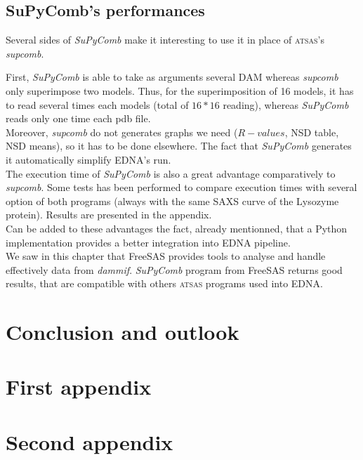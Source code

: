\documentclass[a4paper, 11pt]{report}
\begin{document}
\section{SuPyComb's performances}%

Several sides of \textit{SuPyComb} make it interesting to use it in 
place of \textsc{atsas}'s \textit{supcomb}.

First, \textit{SuPyComb} is able to take as arguments several DAM 
whereas \textit{supcomb} only superimpose two models. 
Thus, for the superimposition of 16 models, it has to read several 
times each models (total of $16*16$ reading), whereas 
\textit{SuPyComb} reads only one time each pdb file.\\
Moreover, \textit{supcomb} do not generates graphs we need 
($R-values$, NSD table, NSD means), so it has to be done elsewhere. 
The fact that \textit{SuPyComb} generates it automatically simplify 
EDNA's run.\\
The execution time of \textit{SuPyComb} is also a great advantage 
comparatively to \textit{supcomb}. 
Some tests has been performed to compare execution times with several 
option of both programs (always with the same SAXS curve of the 
Lysozyme protein). 
Results are presented in the appendix.\\%
Can be added to these advantages the fact, already mentionned, that a 
Python implementation provides a better integration into EDNA 
pipeline.\\

We saw in this chapter that FreeSAS provides tools to analyse and 
handle effectively data from \textit{dammif}. 
\textit{SuPyComb} program from FreeSAS returns good results, that are 
compatible with others \textsc{atsas} programs used into EDNA.


\chapter*{Conclusion and outlook}


\newpage                 %



\appendix


\chapter{First appendix}

\chapter{Second appendix}
\end{document}

